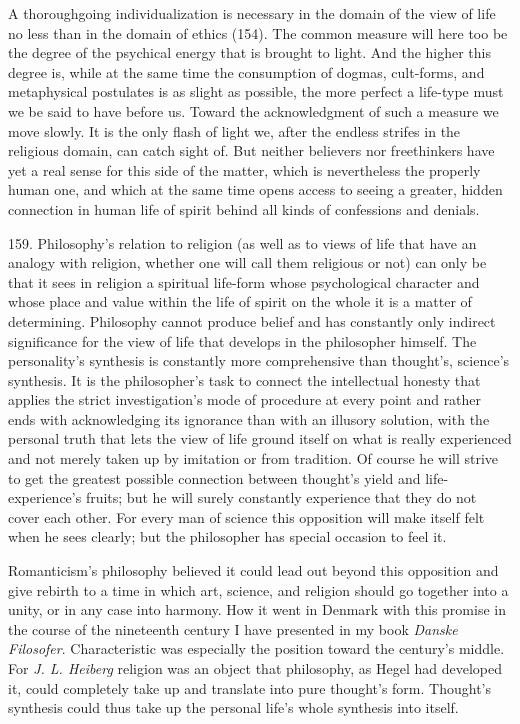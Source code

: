 \documentclass[12pt,a4paper]{book}
\newcommand{\opage}[1]{\marginnote{\footnotesize\textit{[#1]}}}
\begin{document}
A thoroughgoing individualization is necessary in the domain of the view of life no less than in the
domain of ethics (154). The common measure will here too be the degree of the psychical energy that is
brought to light. And the higher this degree is, while at the same time the consumption of dogmas,
cult-forms, and metaphysical postulates is as slight as possible, the more perfect a life-type must we be
said to have before us. Toward the acknowledgment of such a measure we move slowly. It is the only flash
of light we, after the endless strifes in the religious domain, can catch sight of. But neither believers
nor freethinkers \opage{380}have yet a real sense for this side of the matter, which is nevertheless the properly
human one, and which at the same time opens access to seeing a greater, hidden connection in human life
of spirit behind all kinds of confessions and denials.

159. Philosophy's relation to religion (as well as to views of life that have an analogy with religion,
whether one will call them religious or not) can only be that it sees in religion a spiritual life-form
whose psychological character and whose place and value within the life of spirit on the whole it is a
matter of determining. Philosophy cannot produce belief and has constantly only indirect significance for
the view of life that develops in the philosopher himself. The personality's synthesis is constantly more
comprehensive than thought's, science's synthesis. It is the philosopher's task to connect the
intellectual honesty that applies the strict investigation's mode of procedure at every point and rather
ends with acknowledging its ignorance than with an illusory solution, with the personal truth that lets
the view of life ground itself on what is really experienced and not merely taken up by imitation or from
tradition. Of course he will strive to get the greatest possible connection between thought's yield and
life-experience's fruits; but he will surely constantly experience that they do not cover each other. For
every man of science this opposition will make itself felt when he sees clearly; but the philosopher has
special occasion to feel it.

Romanticism's philosophy believed it could lead out beyond this opposition and give rebirth to a time in
which art, science, and religion should go together into a unity, or in any case into harmony. How it went
in Denmark with this promise in the course of the nineteenth century I have presented in my book
\emph{Danske Filosofer}. Characteristic was especially the position toward the century's middle. For
\emph{J. L. Heiberg} religion was an object that philosophy, as Hegel had developed it, could completely
take up and translate into pure thought's form. Thought's synthesis could thus take up the personal life's
whole synthesis into itself.
\end{document}
